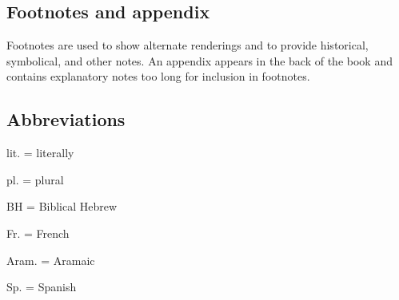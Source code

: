 \subsection*{Footnotes and appendix}
Footnotes are used to show alternate renderings and to provide historical, symbolical, and other notes. An appendix appears in the back of the book and contains explanatory notes too long for inclusion in footnotes.

\subsection*{Abbreviations}
lit. = literally %

pl. = plural

BH = Biblical Hebrew

Fr. = French

Aram. = Aramaic

Sp. = Spanish
\twocolumn
